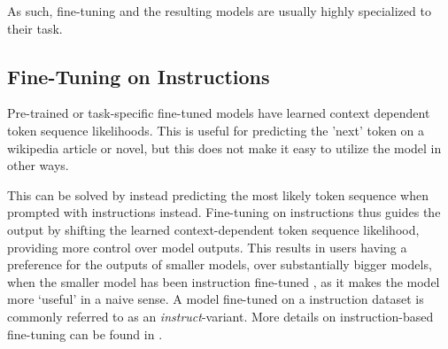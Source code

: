 As such, fine-tuning and the resulting models are usually highly specialized to their task.

\subsection{Fine-Tuning on Instructions}\label{sub:instruct}
Pre-trained or task-specific fine-tuned  models have learned context dependent token sequence likelihoods.
This is useful for predicting the 'next' token on a wikipedia article or novel, but this does not make it easy to utilize the model in other ways.

This can be solved by instead predicting the most likely token sequence when prompted with instructions instead.
Fine-tuning on instructions thus guides the output by shifting the learned context-dependent token sequence likelihood, providing more control over model outputs.
This results in users having a preference for the outputs of smaller models, over substantially bigger models, when the smaller model has been instruction fine-tuned \cite{ouyang_training_2022}, as it makes the model more `useful' in a naive sense.
A model fine-tuned on  a instruction dataset is commonly referred to as an \textit{instruct}-variant.
More details on instruction-based fine-tuning can be found in \cite{ouyang_training_2022, tirumala_d4_2023}.


